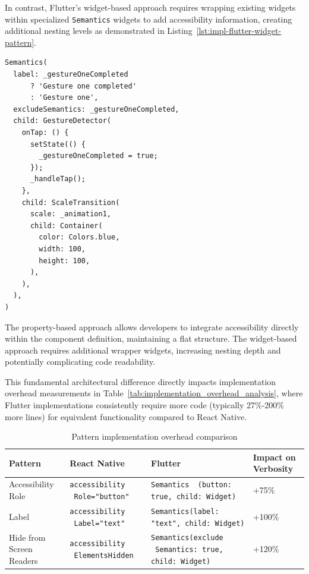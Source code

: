 {\FloatBarrier

In contrast, Flutter's widget-based approach requires wrapping existing widgets within specialized \texttt{Semantics} widgets to add accessibility information, creating additional nesting levels as demonstrated in Listing~\ref{lst:impl-flutter-widget-pattern}.

\begin{lstlisting}[style=DartStyle, caption=Widget-based accessibility pattern in Flutter, label=lst:impl-flutter-widget-pattern]
Semantics(
  label: _gestureOneCompleted 
      ? 'Gesture one completed' 
      : 'Gesture one',
  excludeSemantics: _gestureOneCompleted,
  child: GestureDetector(
    onTap: () {
      setState(() {
        _gestureOneCompleted = true;
      });
      _handleTap();
    },
    child: ScaleTransition(
      scale: _animation1,
      child: Container(
        color: Colors.blue,
        width: 100,
        height: 100,
      ),
    ),
  ),
)
\end{lstlisting}

\FloatBarrier

The property-based approach allows developers to integrate accessibility directly within the component definition, maintaining a flat structure. The widget-based approach requires additional wrapper widgets, increasing nesting depth and potentially complicating code readability.

This fundamental architectural difference directly impacts implementation overhead measurements in Table~\ref{tab:implementation_overhead_analysis}, where Flutter implementations consistently require more code (typically 27\%-200\% more lines) for equivalent functionality compared to React Native.

\begin{table}[ht]
\caption{Pattern implementation overhead comparison}
\label{tab:pattern_implementation_comparison}
\centering
\begin{tabular}{|C{4cm}|C{3.5cm}|C{3.5cm}|C{3cm}|}
\hline
\textbf{Pattern} & \textbf{React Native} & \textbf{Flutter} & \textbf{Impact on Verbosity} \\
\hline
Accessibility Role & \texttt{accessibility \ Role="button"} & \texttt{Semantics \ (button: true, child: Widget)} & +75\% \\
\hline
Label & \texttt{accessibility \ Label="text"} & \texttt{Semantics(label: "text", child: Widget)} & +100\% \\
\hline
Hide from Screen Readers & \texttt{accessibility \ ElementsHidden} & \texttt{Semantics(exclude \ Semantics: true, child: Widget)} & +120\% \\
\hline
\end{tabular}
\end{table}

}
